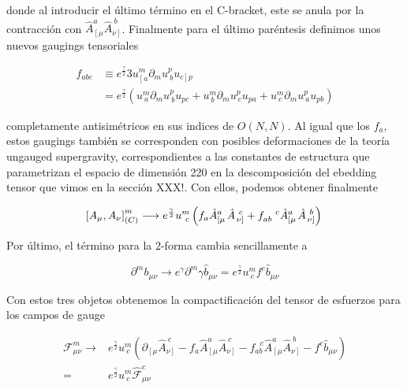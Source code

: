 \documentclass{article}
\numberwithin{equation}{section}
\begin{document}
donde al introducir el último término en el C-bracket, este se anula por la contracción con $ \hat{A}_{\left[\mu \right.}^a \hat{A}_{\left. \nu\right]}^{\ b} $. Finalmente para el último paréntesis definimos unos nuevos gaugings tensoriales 

\begin{equation}
\begin{aligned}
f_{a b c} &\equiv e^{\frac{\gamma}{2}}3 u^{m}_{\left[ a\right.} \partial_m u^{p}_{\ b} u_{\left. c\right] p }\\
&= e^{\frac{\gamma}{2}} \left(u^{m}_{ \ a} \partial_m u^{p}_{\ b} u_{ p c} + u^{m}_{ \ b} \partial_m u^{p}_{\ c} u_{ p a} + u^{m}_{ \ c} \partial_m u^{p}_{\ a} u_{ p b}\right)
\end{aligned}
\end{equation}

completamente antisimétricos en sus indices de $ O(N,N) $. Al igual que los $ f_a $, estos gaugings también se corresponden con posibles deformaciones de la teoría ungauged supergravity, correspondientes a las constantes de estructura que parametrizan el espacio de dimensión 220 en la descomposición del ebedding tensor que vimos en la sección XXX!. Con ellos, podemos obtener finalmente

\begin{equation}\label{Cbrackethat}
\left[A_{\mu}, A_{\nu} \right]_{(C)}^{m} \longrightarrow e^{\frac{\gamma}{2}} u^m_{\ c} \left(  f_a \hat{A}_{\left[\mu \right.}^a \hat{A}_{\left. \nu\right]}^{\ c} + f_{a b}^{\ \ \ c} \hat{A}_{\left[\mu \right.}^a \hat{A}_{\left. \nu\right]}^{\ b}\right)\\
\end{equation}


Por último, el término para la 2-forma cambia sencillamente a

\begin{equation}
\partial^m b_{\mu \nu} \longrightarrow e^{\gamma} \partial^{m}\gamma \hat{b}_{\mu \nu} = e^{\frac{\gamma}{2}} u^{m}_{\ c} f^c \hat{b}_{\mu \nu}
\end{equation}

Con estos tres objetos obtenemos la compactificación del tensor de esfuerzos para los campos de gauge

\begin{boxquation}
	\begin{equation}
	\begin{aligned}
	\mathcal{F}^{m}_{\mu \nu} \longrightarrow& e^{\frac{\gamma}{2}} u^{m}_{\ c} \left( \partial_{\left[\mu\right.} \hat{A}_{\left. \nu\right]}^{\ c} - f_a \hat{A}_{\left[\mu \right.}^a \hat{A}_{\left. \nu\right]}^{\ c} - f_{a b}^{\ \ \ c} \hat{A}_{\left[\mu \right.}^a \hat{A}_{\left. \nu\right]}^{\ b} - f^c \hat{b}_{\mu \nu} \right)\\
	=& e^{\frac{\gamma}{2}} u^{m}_{\ c} \hat{\mathcal{F}}^{c}_{\mu \nu}
	\end{aligned}
	\end{equation}
\end{boxquation}
\end{document}
